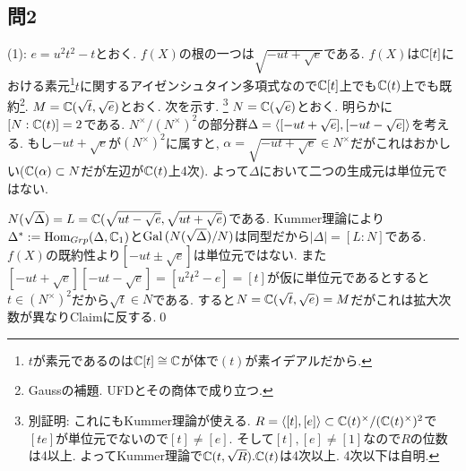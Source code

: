 \subsection{問2}
(1): $e=u^2t^2-t$とおく. $f(X)$の根の一つは$\sqrt{-ut + \sqrt{e}}$である. $f(X)$は$\mathbb{C}[t]$における素元\footnote{$t$が素元であるのは$\mathbb{C}[t] \cong \mathbb{C}$が体で$(t)$が素イデアルだから.}$t$に関するアイゼンシュタイン多項式なので$\mathbb{C}[t] $上でも$\mathbb{C}(t)$上でも既約\footnote{Gaussの補題. UFDとその商体で成り立つ. }.  $M=\mathbb{C}(\sqrt{t},\sqrt{e})$とおく. 次を示す. \footnote{別証明: これにもKummer理論が使える. $R = \langle [t],[e]\rangle \subset \mathbb{C}(t)^{\times}/(\mathbb{C}(t)^{\times})^2$で$[te]$が単位元でないので$[t]\neq [e]$. そして$[t],[e]\neq [1]$なので$R$の位数は4以上. よってKummer理論で$\mathbb{C}(t, \sqrt{R}).\mathbb{C}(t)$は4次以上. 4次以下は自明. }
$N=\mathbb{C}(\sqrt{e})$とおく. 明らかに$[N:\mathbb{C}(t)] = 2$である.
$N^{\times}/(N^{\times})^2$の部分群$\Delta = \langle [-ut + \sqrt{e}], [-ut - \sqrt{e}] \rangle $を考える. もし$-ut + \sqrt{e}$が$(N^{\times})^2$に属すと, $\alpha = \sqrt{-ut + \sqrt{e}} \in N^{\times}$だがこれはおかしい($\mathbb{C}(\alpha)\subset N$だが左辺が$\mathbb{C}(t)$上4次). よって$\Delta$において二つの生成元は単位元ではない. \par
$N(\sqrt{\Delta}) = L = \mathbb{C}(\sqrt{ut-\sqrt{e}}, \sqrt{ut+\sqrt{e}})$である. Kummer理論により $\Delta^{\ast}:= \mathrm{Hom}_{Grp}(\Delta, \mathbb{C}_{1})$と$\operatorname{Gal}{(N(\sqrt{\Delta})/N)}$は同型だから$|\Delta| = [L:N]$である. $f(X)$の既約性より$[-ut\pm \sqrt{e}]$は単位元ではない. また$[-ut + \sqrt{e}][-ut-\sqrt{e}] = [u^2t^2 - e] = [t]$が仮に単位元であるとすると$t\in (N^{\times})^2$だから$\sqrt{t} \in N$である. すると$N=\mathbb{C}(\sqrt{t},\sqrt{e}) = M$だがこれは拡大次数が異なりClaimに反する.\qed \\

